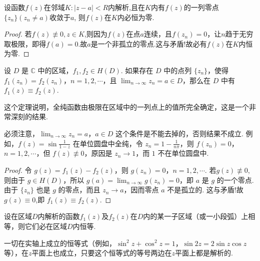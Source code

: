 \documentclass[../../main.tex]{subfiles}%
\begin{document}
\begin{corollary}\label{corollary:复变函数---推论4.20}
设函数$f(z)$在邻域$K:|z-a|<R$内解析,且在$K$内有$f(z)$的一列零点$\{z_n\}(z_n\neq a)$收敛于$a$,
则$f(z)$在$K$内必恒为零.
\end{corollary}
\begin{proof}
若$f(z)\not\equiv 0,z\in K$,则因为$f(z)$在点$a$连续，且$f(z_n)=0$，让$n$趋于无穷取极限，即得$f(a)=0$.故$a$是一个非孤立的零点.这与矛盾!故必有$f(z)$在$K$内恒为零.
\end{proof}

\begin{theorem}[唯一性定理]\label{theorem:复变函数--唯一性定理}
设 \( D \) 是 \( \mathbb{C} \) 中的区域，\( f_1, f_2 \in H(D) \). 如果存在 \( D \) 中的点列 \( \{ z_n \} \)，使得 \( f_1(z_n) = f_2(z_n) \)，\( n = 1, 2, \cdots \)，且 \( \lim_{n \to \infty} z_n = a \in D \)，那么在 \( D \) 中有 \( f_1(z) \equiv f_2(z) \).
\end{theorem}
\begin{remark}
这个定理说明，全纯函数由极限在区域中的一列点上的值所完全确定，这是一个非常深刻的结果.
\end{remark}
\begin{remark}
必须注意，\(\lim_{n \to \infty} z_n = a\)，\(a \in D\) 这个条件是不能去掉的，否则结果不成立. 例如，\(f(z) = \sin \frac{1}{1 - z}\) 在单位圆盘中全纯，令 \(z_n = 1 - \frac{1}{n\pi}\)，则 \(f(z_n) = 0\)，\(n = 1, 2, \cdots\)，但 \(f(z) \not\equiv 0\)，原因是 \(z_n \to 1\)，而 \(1\) 不在单位圆盘中.
\end{remark}
\begin{proof}
令 \( g(z) = f_1(z) - f_2(z) \)，则 \( g(z_n) = 0 \)，\( n = 1, 2, \cdots \). 若$g(z)\not\equiv 0 $,则由于 \( g \in H(D) \)，所以 \( g(a) = \lim_{n \to \infty} g(z_n) = 0 \)，即 \( a \) 是 \( g \) 的一个零点. 由于 \( \{ z_n \} \) 也是 \( g \) 的零点，而且 \( z_n \to a \)，因而零点 \( a \) 不是孤立的. 这与矛盾!故$g(z)\equiv 0$,即 \( f_1(z) \equiv f_2(z) \).
\end{proof}

\begin{corollary}\label{corollary:复变函数--推论4.22}
设在区域$D$内解析的函数$f_1(z)$及$f_2(z)$在$D$内的某一子区域（或一小段弧）上相等，则它们必在区域$D$内恒等.
\end{corollary}

\begin{corollary}
一切在实轴上成立的恒等式（例如，$\sin^2 z+\cos^2 z=1$，$\sin 2z=2\sin z\cos z$等），在$z$平面上也成立，只要这个恒等式的等号两边在$z$平面上都是解析的.
\end{corollary}
\end{document}
